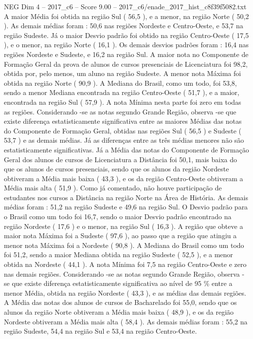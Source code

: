 \begin{textsample}{NEG Dim 4 – 2017\_c6 – Score 9.00 – 2017\_c6/enade\_2017\_hist\_c8f39f5082.txt}
A maior Média foi obtida na região Sul ( 56,5 ), e a menor, na região Norte ( 50,2 ).
As demais médias foram : 50,6 nas regiões Nordeste e Centro-Oeste, e 53,7 na região Sudeste.
Já o maior Desvio padrão foi obtido na região Centro-Oeste ( 17,5 ), e o menor, na região Norte ( 16,1 ).
Os demais desvios padrões foram : 16,4 nas regiões Nordeste e Sudeste, e 16,2 na região Sul.
A maior nota no Componente de Formação Geral da prova de alunos de cursos presenciais de Licenciatura foi 98,2, obtida por, pelo menos, um aluno na região Sudeste.
A menor nota Máxima foi obtida na região Norte ( 90,9 ).
A Mediana do Brasil, como um todo, foi 53,8, sendo a menor Mediana encontrada na região Centro-Oeste ( 51,7 ), e a maior, encontrada na região Sul ( 57,9 ).
A nota Mínima nesta parte foi zero em todas as regiões.
Considerando -se as notas segundo Grande Região, observa -se que existe diferença estatisticamente significativa entre as maiores Médias das notas do Componente de Formação Geral, obtidas nas regiões Sul ( 56,5 ) e Sudeste ( 53,7 ) e as demais médias.
Já as diferenças entre as três médias menores não são estatisticamente significativas.
Já a Média das notas do Componente de Formação Geral dos alunos de cursos de Licenciatura a Distância foi 50,1, mais baixa do que os alunos de cursos presenciais, sendo que os alunos da região Nordeste obtiveram a Média mais baixa ( 43,3 ), e os da região Centro-Oeste obtiveram a Média mais alta ( 51,9 ).
Como já comentado, não houve participação de estudantes nos cursos a Distância na região Norte na Área de História.
As demais médias foram : 51,2 na região Sudeste e 49,6 na região Sul.
O Desvio padrão para o Brasil como um todo foi 16,7, sendo o maior Desvio padrão encontrado na região Nordeste ( 17,6 ) e o menor, na região Sul ( 16,3 ).
A região que obteve a maior nota Máxima foi a Sudeste ( 97,6 ), ao passo que a região que atingiu a menor nota Máxima foi a Nordeste ( 90,8 ).
A Mediana do Brasil como um todo foi 51,2, sendo a maior Mediana obtida na região Sudeste ( 52,5 ), e a menor obtida na Nordeste ( 44,1 ).
A nota Mínima foi 7,5 na região Centro-Oeste e zero nas demais regiões.
Considerando -se as notas segundo Grande Região, observa -se que existe diferença estatisticamente significativa ao nível de 95 \% entre a menor Média, obtida na região Nordeste ( 43,3 ), e as médias das demais regiões.
A Média das notas dos alunos de cursos de Bacharelado foi 55,0, sendo que os alunos da região Norte obtiveram a Média mais baixa ( 48,9 ), e os da região Nordeste obtiveram a Média mais alta ( 58,4 ).
As demais médias foram : 55,2 na região Sudeste, 54,4 na região Sul e 53,4 na região Centro-Oeste.

\end{textsample}
